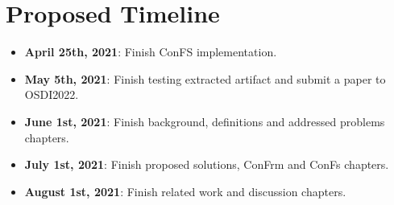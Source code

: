\section{Proposed Timeline}
\begin{itemize}
	\item \textbf{April 25th, 2021}: Finish ConFS implementation.
	\item \textbf{May 5th, 2021}: Finish testing extracted artifact and submit a paper to OSDI2022.
	\item \textbf{June 1st, 2021}: Finish background, definitions and addressed problems chapters.
	\item \textbf{July 1st, 2021}: Finish proposed solutions, ConFrm and ConFs chapters.
	\item \textbf{August 1st, 2021}: Finish related work and discussion chapters.
\end{itemize}